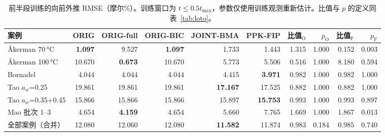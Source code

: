 \begin{table}[t]
\centering
\caption{前半段训练的向前外推 RMSE（摩尔\%）。训练窗口为 $t\le0.5t_\mathrm{max}$，参数仅使用训练观测重新估计。比值与 $p$ 的定义同表~\ref{tab:loto}。}\label{tab:fcst}
\footnotesize
\begin{adjustbox}{max width=\linewidth}
\begin{tabular}{lrrrrrrrrr}
\toprule
案例 & ORIG & ORIG-full & ORIG-BIC & JOINT-BMA & PPK-FIP & 比值$_\mathrm{O}$ & $p_\mathrm{O}$ & 比值$_\mathrm{F}$ & $p_\mathrm{F}$ \\
\midrule
Åkerman 70\,°C & \textbf{1.097} & 9.527 & \textbf{1.097} & 1.733 & 1.443 & 1.315 & 1.000 & 0.152 & 0.003 \\
Åkerman 100\,°C & 10.670 & \textbf{0.673} & 10.670 & 5.773 & 5.506 & 0.516 & 1.000 & 8.180 & 0.594 \\
Bornadel & 4.044 & 4.044 & 4.044 & 4.415 & \textbf{3.971} & 0.982 & 1.000 & 0.982 & 1.000 \\
Tao $a_w$=0.25 & 19.861 & 19.861 & 19.861 & \textbf{17.167} & 17.525 & 0.882 & 1.000 & 0.882 & 1.000 \\
Tao $a_w$=0.35+0.45 & 15.866 & 15.866 & 15.866 & 15.897 & \textbf{15.753} & 0.993 & 1.000 & 0.993 & 0.897 \\
Mao 批次 1--3 & 4.654 & \textbf{4.159} & 4.654 & 5.660 & 7.765 & 1.669 & 1.000 & 1.867 & 0.013 \\
\midrule
全部案例（合并） & 12.080 & 12.060 & 12.080 & \textbf{11.582} & 11.874 & 0.983 & 0.184 & 0.985 & 0.740 \\
\bottomrule
\end{tabular}
\end{adjustbox}
\end{table}

